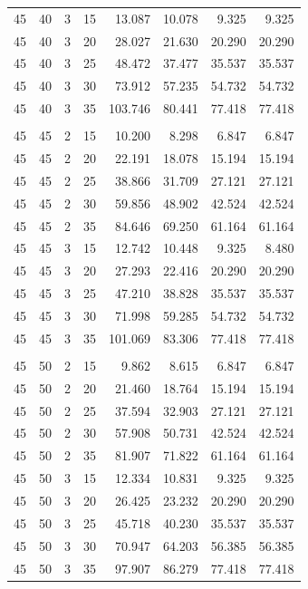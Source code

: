 \documentclass{article}
\begin{document}
\begin{longtable}{rrrrrrrr}
45 & 40 & 3 & 15 & 13.087 & 10.078 & 9.325 & 9.325 \\
45 & 40 & 3 & 20 & 28.027 & 21.630 & 20.290 & 20.290 \\
45 & 40 & 3 & 25 & 48.472 & 37.477 & 35.537 & 35.537 \\
45 & 40 & 3 & 30 & 73.912 & 57.235 & 54.732 & 54.732 \\
45 & 40 & 3 & 35 & 103.746 & 80.441 & 77.418 & 77.418 \\
\addlinespace
\multicolumn{8}{l}{\textbf{$\theta_1=45^\circ$, $\theta_2=45^\circ$}} \\
45 & 45 & 2 & 15 & 10.200 & 8.298 & 6.847 & 6.847 \\
45 & 45 & 2 & 20 & 22.191 & 18.078 & 15.194 & 15.194 \\
45 & 45 & 2 & 25 & 38.866 & 31.709 & 27.121 & 27.121 \\
45 & 45 & 2 & 30 & 59.856 & 48.902 & 42.524 & 42.524 \\
45 & 45 & 2 & 35 & 84.646 & 69.250 & 61.164 & 61.164 \\
45 & 45 & 3 & 15 & 12.742 & 10.448 & 9.325 & 8.480 \\
45 & 45 & 3 & 20 & 27.293 & 22.416 & 20.290 & 20.290 \\
45 & 45 & 3 & 25 & 47.210 & 38.828 & 35.537 & 35.537 \\
45 & 45 & 3 & 30 & 71.998 & 59.285 & 54.732 & 54.732 \\
45 & 45 & 3 & 35 & 101.069 & 83.306 & 77.418 & 77.418 \\
\addlinespace
\multicolumn{8}{l}{\textbf{$\theta_1=45^\circ$, $\theta_2=50^\circ$}} \\
45 & 50 & 2 & 15 & 9.862 & 8.615 & 6.847 & 6.847 \\
45 & 50 & 2 & 20 & 21.460 & 18.764 & 15.194 & 15.194 \\
45 & 50 & 2 & 25 & 37.594 & 32.903 & 27.121 & 27.121 \\
45 & 50 & 2 & 30 & 57.908 & 50.731 & 42.524 & 42.524 \\
45 & 50 & 2 & 35 & 81.907 & 71.822 & 61.164 & 61.164 \\
45 & 50 & 3 & 15 & 12.334 & 10.831 & 9.325 & 9.325 \\
45 & 50 & 3 & 20 & 26.425 & 23.232 & 20.290 & 20.290 \\
45 & 50 & 3 & 25 & 45.718 & 40.230 & 35.537 & 35.537 \\
45 & 50 & 3 & 30 & 70.947 & 64.203 & 56.385 & 56.385 \\
45 & 50 & 3 & 35 & 97.907 & 86.279 & 77.418 & 77.418 \\

\end{longtable}
\end{document}
